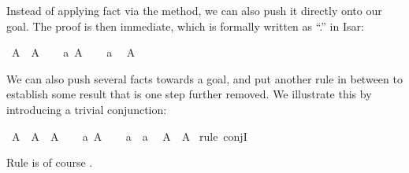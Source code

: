 \begin{isabellebody}
\begin{isamarkuptext}
Instead of applying fact  via the  method, we can
also push it directly onto our goal.  The proof is then immediate,
which is formally written as ``.'' in Isar:%
\end{isamarkuptext}%
\isamarkuptrue%
\isamarkupfalse%
\ {}A\ {}\ A{}\isanewline
%
\isadelimproof
%
\endisadelimproof
%
\isatagproof
{}\isamarkupfalse%
\isanewline
\ \ \isamarkupfalse%
\ a{}\ {}A{}\isanewline
\ \ \isamarkupfalse%
\ a\ \isamarkupfalse%
\ {}A{}\ \isamarkupfalse%
\isanewline
{}\isamarkupfalse%
%
\endisatagproof
{\isafoldproof}%
%
\isadelimproof
%
\endisadelimproof
%
\begin{isamarkuptext}%
We can also push several facts towards a goal, and put another
rule in between to establish some result that is one step further
removed.  We illustrate this by introducing a trivial conjunction:%
\end{isamarkuptext}%
\isamarkuptrue%
\isamarkupfalse%
\ {}A\ {}\ A\ {}\ A{}\isanewline
%
\isadelimproof
%
\endisadelimproof
%
\isatagproof
{}\isamarkupfalse%
\isanewline
\ \ \isamarkupfalse%
\ a{}\ {}A{}\isanewline
\ \ \isamarkupfalse%
\ a\ \ a\ \isamarkupfalse%
\ {}A\ {}\ A{}\ \isamarkupfalse%
{}rule\ conjI{}\isanewline
{}\isamarkupfalse%
%
\endisatagproof
{\isafoldproof}%
%
\isadelimproof
%
\endisadelimproof
%
\begin{isamarkuptext}%
\noindent Rule  is of course .


\end{isamarkuptext}
\end{isabellebody}
